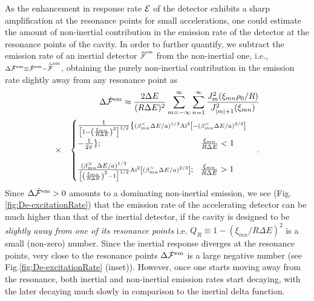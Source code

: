 \documentclass[aps,prl,nofootinbib,preprintnumbers,floatfix,twocolumn,superscriptaddress]{revtex4}
\def\nn{\nonumber}
\def\nn{\nonumber}
\def\l{\left}
\def\r{\right}
\def\f{\frac}
\begin{document}
As the enhancement in response rate ${\cal E}$ of the detector exhibits a 
sharp amplification at the 
resonance points for small accelerations, one could estimate the amount of non-inertial 
contribution in the emission rate of the detector at the resonance points of the cavity.
In order to further 
quantify, we subtract the emission rate of an inertial detector 
${\scriptstyle {\dot {\cal \widetilde F}}^{\rm	em}}$ 
from the non-inertial one, i.e., 
${\scriptstyle \Delta {\dot {\cal F}}^{\rm em}\equiv {\dot {\cal F}}^{\rm em}
-{\dot {\cal \widetilde F}}^{\rm em}}$, obtaining the purely non-inertial contribution 
in the emission rate slightly away from any resonance point as 
\begin{eqnarray}
\label{eqn:Difference}
 & & \Delta {\dot {\cal F}}^{\rm em} \approx 
 \f{2 \Delta E}{(R\Delta E)^2}
 \sum_{m=-\infty}^{\infty} \sum_{n=1}^{\infty}
 \f{J_{m}^2(\xi_{mn} \rho_0/R)}{J^2_{|m|+1}(\xi_{mn})} \\
 &\times&
 \begin{cases} 
 \f{1}{\l[1-\l(\f{\xi_{mn}}{R\Delta E}\r)^2\r]^{1/2}} 
 \{{\scriptstyle (\beta_{mn}^{<} \Delta E/a)^{1/3} 
 {\rm Ai}^2\l[-(\beta_{mn}^{<}\Delta E/a)^{2/3}\r]} \\
 -\f{1}{2\pi}\}; \hskip 4.1cm \f{\xi_{mn}}{R\Delta E} < 1  \\ \\
 \f{(\beta_{mn}^{>} \Delta E/a)^{1/3}}
 {\l[\l(\f{\xi_{mn}}{R\Delta E}\r)^2-1\r]^{1/2}}
 {\scriptstyle {\rm Ai}^2\l[(\beta_{mn}^{>} \Delta E/a)^{2/3}\r]};~~ 
 \f{\xi_{mn}}{R\Delta E} > 1
 \end{cases}. \nn
\end{eqnarray}
Since $ \Delta {\dot {\cal F}}^{\rm em}>0$ amounts to a dominating non-inertial 
emission, we see (Fig.\ref{fig:De-excitationRate}) that the emission rate of 
the accelerating detector can be 
much higher than that of the inertial detector, if the cavity is designed 
to be {\it slightly away from one of its resonance points} i.e. 
$Q_R\equiv 1-(\xi_{mn}/R\Delta E)^2$ is a small (non-zero) number. Since the 
inertial response diverges at the resonance points, very close to the 
resonance points $\Delta {\dot {\cal F}}^{\rm em}$ is a large negative number 
(see Fig.\ref{fig:De-excitationRate} (inset)). However, once one starts moving away 
from the resonance, both inertial and non-inertial emission rates start 
decaying, with the later decaying much slowly in comparison to the inertial delta function. 
\end{document}
